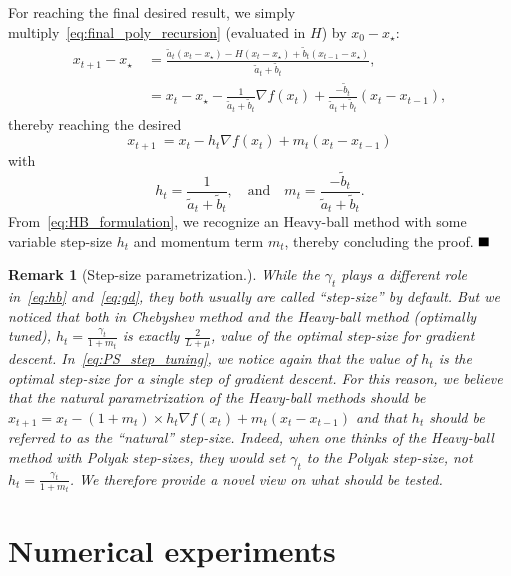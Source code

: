 \documentclass{article}
\newtheorem{Rem}[Th]{Remark}
\newcommand{\xs}{x_\star}
\begin{document}
        For reaching the final desired result, we simply multiply~\cref{eq:final_poly_recursion} (evaluated in $H$) by $x_0 - \xs$:
        \begin{align}
            x_{t+1} - \xs &~ = \frac{\tilde{a}_t (x_t - \xs) - H (x_t - \xs) + \tilde{b}_t (x_{t-1} - \xs)}{\tilde{a}_t + \tilde{b}_t}, \nonumber \\
            &~ = x_t - \xs - \frac{1}{\tilde{a}_t + \tilde{b}_t} \nabla f (x_t) + \frac{- \tilde{b}_t}{\tilde{a}_t + \tilde{b}_t} (x_t - x_{t-1}), \nonumber
        \end{align}
    thereby reaching the desired
    \begin{equation}
        x_{t+1} ~ = x_t - h_t \nabla f (x_t) + m_t (x_t - x_{t-1})
            \label{eq:HB_formulation}
    \end{equation}
        with
        \begin{equation}
            h_t = \frac{1}{\tilde{a}_t + \tilde{b}_t}, \quad \text{and} \quad m_t = \frac{- \tilde{b}_t}{\tilde{a}_t + \tilde{b}_t}.
            \label{eq:HB_tuning}
        \end{equation}
    From~\cref{eq:HB_formulation}, we recognize an Heavy-ball method with some variable step-size $h_t$ and momentum term $m_t$, thereby concluding the proof. $\hfill\blacksquare$

\begin{Rem}[Step-size parametrization.]
    While the $\gamma_t$ plays a different role in~\cref{eq:hb} and~\cref{eq:gd}, they both usually are called ``step-size'' by default.
    But we noticed that both in Chebyshev method and the Heavy-ball method (optimally tuned), $h_t = \frac{\gamma_t}{1 + m_t}$ is exactly $\frac{2}{L + \mu}$, value of the optimal step-size for gradient descent.
    In~\cref{eq:PS_step_tuning}, we notice again that the value of $h_t$ is the optimal step-size for a single step of gradient descent.
    For this reason, we believe that the natural parametrization of the Heavy-ball methods should be $x_{t+1} = x_t - (1 + m_t) \times h_t \nabla f(x_t) + m_t (x_t - x_{t-1})$ and that $h_t$ should be referred to as the ``natural'' step-size.
    Indeed, when one thinks of the Heavy-ball method with Polyak step-sizes, they would set $\gamma_t$ to the Polyak step-size, not $h_t = \frac{\gamma_t}{1 + m_t}$.
    We therefore provide a novel view on what should be tested.
\end{Rem}

\section{Numerical experiments}\label{sec:experiments}
\end{document}
